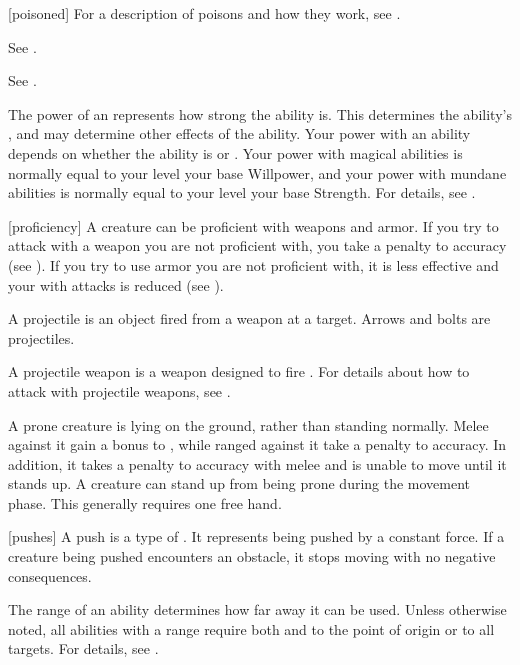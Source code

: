 [poisoned] For a description of poisons and how they work, see .

 See .

 See .

 The power of an  represents how strong the ability is.
This determines the ability's , and may determine other effects of the ability.
Your power with an ability depends on whether the ability is  or .
Your power with magical abilities is normally equal to your level \add your base Willpower, and your power with mundane abilities is normally equal to your level \add your base Strength.
For details, see .

[proficiency] A creature can be proficient with weapons and armor.
If you try to attack with a weapon you are not proficient with, you take a  penalty to accuracy (see ).
If you try to use armor you are not proficient with, it is less effective and your  with  attacks is reduced (see ).

 A projectile is an object fired from a weapon at a target.
Arrows and bolts are projectiles.

 A projectile weapon is a weapon designed to fire .
For details about how to attack with projectile weapons, see .

 A prone creature is lying on the ground, rather than standing normally.
Melee  against it gain a  bonus to , while ranged  against it take a  penalty to accuracy.
In addition, it takes a  penalty to accuracy with melee  and is unable to move until it stands up.
A creature can stand up from being prone during the movement phase.
This generally requires one free hand.

[pushes] A push is a type of .
It represents being pushed by a constant force.
If a creature being pushed encounters an obstacle, it stops moving with no negative consequences.

 The range of an ability determines how far away it can be used.
Unless otherwise noted, all abilities with a range require both  and  to the point of origin or to all targets.
For details, see .

